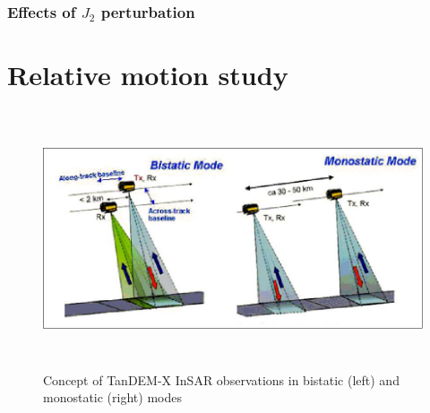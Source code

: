 \documentclass[11pt,letterpaper]{article}
\begin{document}
\subsubsection{Effects of $J_2$ perturbation}




\section{Relative motion study}

\begin{figure}[H]
	\centering
    \includegraphics[height=3in]{Figures/monobi.jpeg}
    \caption{Concept of TanDEM-X InSAR observations in bistatic (left) and monostatic (right) modes}
    \label{figure:modes}
\end{figure}
\end{document}
